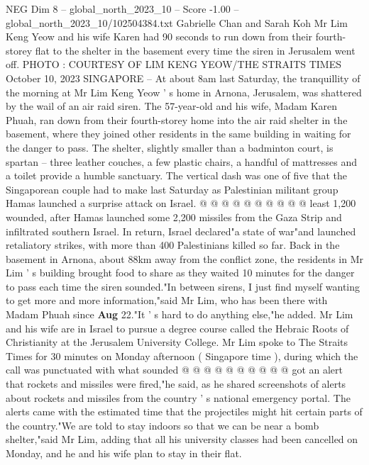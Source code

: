 \begin{textsample}{NEG Dim 8 – global\_north\_2023\_10 – Score -1.00 – global\_north\_2023\_10/102504384.txt}  \label{ex:f8_neg_244}
Gabrielle Chan and Sarah Koh Mr Lim Keng Yeow and his wife Karen had 90 seconds to run down from their fourth-storey flat to the shelter in the basement every time the siren in Jerusalem went off.
PHOTO : COURTESY OF LIM KENG YEOW/THE STRAITS TIMES October 10, 2023 SINGAPORE -- At about 8am last Saturday, the tranquillity of the morning at Mr Lim Keng Yeow ' s home in Arnona, Jerusalem, was shattered by the wail of an air raid siren.
The 57-year-old and his wife, Madam Karen Phuah, ran down from their fourth-storey home into the air raid shelter in the basement, where they joined other residents in the same building in waiting for the danger to pass.
The shelter, slightly smaller than a badminton court, is spartan -- three leather couches, a few plastic chairs, a handful of mattresses and a toilet provide a humble sanctuary.
The vertical dash was one of five that the Singaporean couple had to make last Saturday as Palestinian militant group Hamas launched a surprise attack on Israel. @ @ @ @ @ @ @ @ @ @ least 1,200 wounded, after Hamas launched some 2,200 missiles from the Gaza Strip and infiltrated southern Israel.
In return, Israel declared"a state of war"and launched retaliatory strikes, with more than 400 Palestinians killed so far.
Back in the basement in Arnona, about 88km away from the conflict zone, the residents in Mr Lim ' s building brought food to share as they waited 10 minutes for the danger to pass each time the siren sounded."In between sirens, I just find myself wanting to get more and more information,"said Mr Lim, who has been there with Madam Phuah since \textbf{Aug} 22."It ' s hard to do anything else,"he added.
Mr Lim and his wife are in Israel to pursue a degree course called the Hebraic Roots of Christianity at the Jerusalem University College.
Mr Lim spoke to The Straits Times for 30 minutes on Monday afternoon ( Singapore time ), during which the call was punctuated with what sounded @ @ @ @ @ @ @ @ @ @ got an alert that rockets and missiles were fired,"he said, as he shared screenshots of alerts about rockets and missiles from the country ' s national emergency portal.
The alerts came with the estimated time that the projectiles might hit certain parts of the country."We are told to stay indoors so that we can be near a bomb shelter,"said Mr Lim, adding that all his university classes had been cancelled on Monday, and he and his wife plan to stay in their flat.

\end{textsample}
